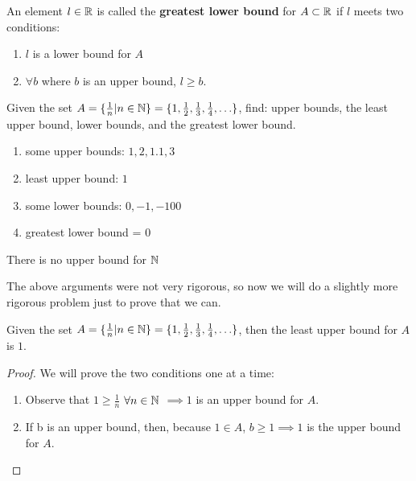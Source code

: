 \begin{definition}
	An element $l \in \mathbb{R}$ is called the \textbf{greatest lower bound} for $A \subset \mathbb{R}$ if $l$ meets two conditions:
	\begin{enumerate}
		\item $l$ is a lower bound for $A$
		\item $\forall b$ where $b$ is an upper bound, $l \ge  b$.
	\end{enumerate}
\end{definition}

\begin{eg}
	Given the set $A = \{\frac{1}{n} | n \in \mathbb{N}\} = \{1, \frac{1}{2}, \frac{1}{3}, \frac{1}{4}, \ldots\}$, find: upper bounds, the least upper bound, lower bounds, and the greatest lower bound.

\end{eg}

\begin{enumerate}
	\item some upper bounds: $1, 2, 1.1, 3$ 
	\item least upper bound: $1$ 
	\item some lower bounds: $0, -1, -100$
	\item greatest lower bound =  $0$
\end{enumerate}

\begin{eg}
	There is no upper bound for $\mathbb{N}$
\end{eg}

The above arguments were not very rigorous, so now we will do a slightly more rigorous problem just to prove that we can.

\begin{theorem}
	Given the set $A = \{\frac{1}{n} | n \in \mathbb{N}\} = \{1, \frac{1}{2}, \frac{1}{3}, \frac{1}{4}, \ldots\}$, then the least upper bound for $A$ is $1$.
\end{theorem}

\begin{proof}
	We will prove the two conditions one at a time:
	\begin{enumerate}
		\item Observe that $1 \ge \frac{1}{n}$ $\forall n \in \mathbb{N}$ $\implies 1$ is an upper bound for $A$.
		\item If b is an upper bound, then, because $1 \in A$, $b \ge 1 \implies 1$ is the upper bound for $A$. 
	\end{enumerate}
\end{proof}

